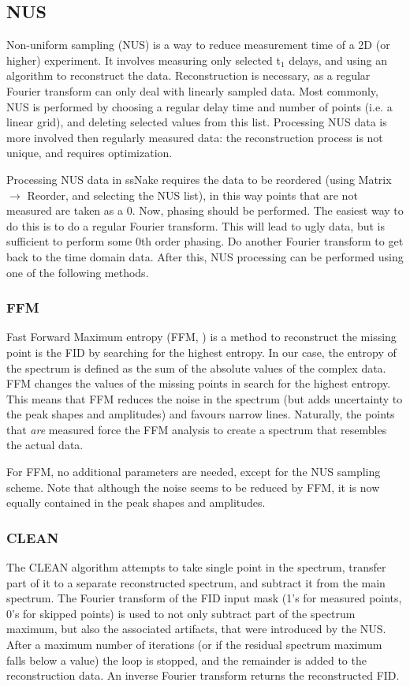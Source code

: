\documentclass[11pt,a4paper]{article}
\begin{document}
\subsection{NUS}
Non-uniform sampling (NUS) is a way to reduce measurement time of a 2D (or higher) experiment.
It involves measuring only selected t$_1$ delays, and using an algorithm to reconstruct the data.
Reconstruction is necessary, as a regular Fourier transform can only deal with linearly sampled data.
Most commonly, NUS is performed by choosing a regular delay time and number of points (i.e. a linear grid), and deleting selected values from this list.
Processing NUS data is more involved then regularly measured data: the reconstruction process is not unique, and requires optimization.

Processing NUS data in ssNake requires the data to be reordered (using Matrix $\rightarrow$ Reorder, and selecting the NUS list), in this way points that are not measured are taken as a 0.
Now, phasing should be performed.
The easiest way to do this is to do a regular Fourier transform.
This will lead to ugly data, but is sufficient to perform some 0th order phasing.
Do another Fourier transform to get back to the time domain data.
After this, NUS processing can be performed using one of the following methods.

\subsubsection{FFM}
Fast Forward Maximum entropy (FFM, \cite{balsgart2012fast}) is a method to reconstruct the missing point is the FID by searching for the highest entropy.
In our case, the entropy of the spectrum is defined as the sum of the absolute values of the complex data.
FFM changes the values of the missing points in search for the highest entropy.
This means that FFM reduces the noise in the spectrum (but adds uncertainty to the peak shapes and amplitudes) and favours narrow lines.
Naturally, the points that \textit{are} measured force the FFM analysis to create a spectrum that resembles the actual data.

For FFM, no additional parameters are needed, except for the NUS sampling scheme.
Note that although the noise seems to be reduced by FFM, it is now equally contained in the peak shapes and amplitudes.

\subsubsection{CLEAN}
The CLEAN algorithm attempts to take single point in the spectrum, transfer part of it to a separate reconstructed spectrum, and subtract it from the main spectrum.
The Fourier transform of the FID input mask (1's for measured points, 0's for skipped points) is used to not only subtract part of the spectrum maximum, but also the
associated artifacts, that were introduced by the NUS. After a maximum number of iterations (or if the residual spectrum maximum falls below a value) the
loop is stopped, and the remainder is added to the reconstruction data. An inverse Fourier transform returns the reconstructed FID.
\end{document}
